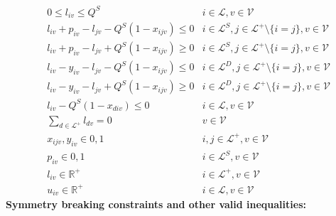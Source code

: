 \begin{eqnarray}
	    & 0 \leq l_{iv} \leq Q^{S} & i \in \mathcal{L}, v \in \mathcal{V} \label{eq:const_vcap}\\
	    & l_{iv} + p_{iv} - l_{jv} - Q^{S}(1-x_{ijv}) \leq 0 & i \in \mathcal{L}^{S}, j \in \mathcal{L}^{+} \setminus\{i=j\}, v \in \mathcal{V} \label{eq:const_vcap_pickup}\\
	    & l_{iv} + p_{iv} - l_{jv} + Q^{S}(1-x_{ijv}) \geq 0 & i \in \mathcal{L}^{S}, j \in \mathcal{L}^{+} \setminus\{i=j\}, v \in \mathcal{V} \label{eq:const_vcap_pickup}\\
	    & l_{iv} - y_{iv} - l_{jv} - Q^{S}(1-x_{ijv}) \leq 0 & i \in \mathcal{L}^{D}, j \in \mathcal{L}^{+} \setminus\{i=j\}, v \in \mathcal{V} \label{eq:const_vcap_delivery}\\
	    & l_{iv} - y_{iv} - l_{jv} + Q^{S}(1-x_{ijv}) \geq 0 & i \in \mathcal{L}^{D}, j \in \mathcal{L}^{+} \setminus\{i=j\}, v \in \mathcal{V} \label{eq:const_vcap_delivery}\\
	    & l_{iv} - Q^{S}(1-x_{div}) \leq 0 & i \in \mathcal{L}, v \in \mathcal{V} \label{eq:const_vcap_depot_out}\\
	    & \displaystyle\sum_{d\in \mathcal{L}^+}l_{dv} = 0 & v \in \mathcal{V} \label{eq:const_vcap_depot_in}\\
	    & x_{ijv}, y_{iv} \in {0, 1} &   i,j\in \mathcal{L}^{+}, v\in \mathcal{V} \\
	    & p_{iv} \in {0, 1} &   i\in \mathcal{L}^{S}, v\in \mathcal{V} \\
	    & l_{iv} \in \mathbb{R}^{+} & i\in \mathcal{L}^{+}, v\in \mathcal{V} \\
	    & u_{iv} \in \mathbb{R}^{+} & i\in \mathcal{L}, v\in \mathcal{V} 
\end{eqnarray}
\newpage
\textbf{Symmetry breaking constraints and other valid inequalities:}
